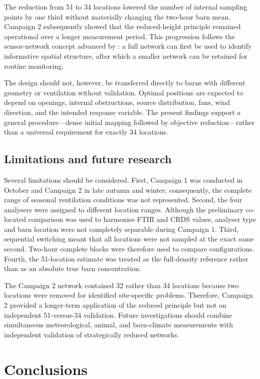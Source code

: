 \documentclass[12pt,a4paper]{article}
\begin{document}
The reduction from 51 to 34 locations lowered the number of internal sampling
points by one third without materially changing the two-hour barn mean.
Campaign 2 subsequently showed that the reduced-height principle remained
operational over a longer measurement period. This progression follows the
sensor-network concept advanced by \citet{Chen2026}: a full network can first
be used to identify informative spatial structure, after which a smaller
network can be retained for routine monitoring.

The design should not, however, be transferred directly to barns with
different geometry or ventilation without validation. Optimal positions are
expected to depend on openings, internal obstructions, source distribution,
fans, wind direction, and the intended response variable. The present
findings support a general procedure---dense initial mapping followed by
objective reduction---rather than a universal requirement for exactly 34
locations.

\subsection{Limitations and future research}

Several limitations should be considered. First, Campaign 1 was conducted in
October and Campaign 2 in late autumn and winter; consequently, the complete
range of seasonal ventilation conditions was not represented. Second, the
four analysers were assigned to different location ranges. Although the
preliminary co-located comparison was used to harmonise FTIR and CRDS values,
analyser type and barn location were not completely separable during Campaign
1. Third, sequential switching meant that all locations were not sampled at
the exact same second. Two-hour complete blocks were therefore used to compare
configurations. Fourth, the 51-location estimate was treated as the
full-density reference rather than as an absolute true barn concentration.

The Campaign 2 network contained 32 rather than 34 locations because two
locations were removed for identified site-specific problems. Therefore,
Campaign 2 provided a longer-term application of the reduced principle but
not an independent 51-versus-34 validation. Future investigations should
combine simultaneous meteorological, animal, and barn-climate measurements
with independent validation of strategically reduced networks.

\section{Conclusions}
\end{document}
